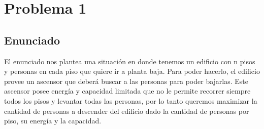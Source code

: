 \section{Problema 1}

\subsection{Enunciado}
El enunciado nos plantea una situación en donde tenemos un edificio con n pisos y personas en cada piso que quiere ir a planta baja. Para poder hacerlo, el edificio provee un 
ascensor que deberá buscar a las personas para poder bajarlas. 
Este ascensor posee energía y capacidad limitada que no le permite recorrer siempre todos los pisos y levantar todas las personas, por lo tanto queremos maximizar la cantidad
de personas a descender del edificio dado la cantidad de personas por piso, su energía y la capacidad.


